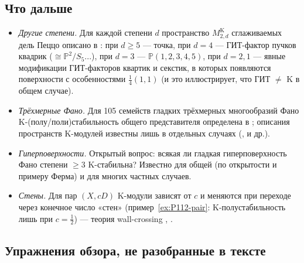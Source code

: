 \documentclass[11pt,a4paper]{article}
\theoremstyle{plain}
\theoremstyle{definition}
\theoremstyle{remark}
\newcommand{\PP}{\mathbb{P}}
\begin{document}
\subsection{Что дальше}

\begin{itemize}
\item \emph{Другие степени.} Для каждой степени $d$ пространство $M^{\mathrm K}_{2,d}$ сглаживаемых
дель Пеццо описано в \cite{OSS}: при $d\ge5$ --- точка, при $d=4$ --- ГИТ-фактор пучков квадрик
($\cong\PP^2/S_5$...), при $d=3$ --- $\PP(1,2,3,4,5)$, при $d=2,1$ --- явные модификации
ГИТ-факторов квартик и секстик, в которых появляются поверхности с особенностями $\frac14(1,1)$
(и это иллюстрирует, что ГИТ $\ne$ K в общем случае).
\item \emph{Трёхмерные Фано.} Для 105 семейств гладких трёхмерных многообразий Фано
K-(полу/поли)стабильность общего представителя определена в \cite{ACCFKMSV}; описания
пространств K-модулей известны лишь в отдельных случаях (\cite{ADL23}, \cite{DJKHQ} и др.).
\item \emph{Гиперповерхности.} Открытый вопрос: всякая ли гладкая гиперповерхность Фано степени
$\ge3$ K-стабильна? Известно для общей (по открытости и примеру Ферма) и для многих частных
случаев.
\item \emph{Стены.} Для пар $(X,cD)$ K-модули зависят от $c$ и меняются при переходе через
конечное число «стен» (пример~\ref{ex:P112-pair}: K-полустабильность лишь при $c=\frac12$) ---
теория wall-crossing \cite{ADL}, \cite{ADL23}.
\end{itemize}

\subsection{Упражнения обзора, не разобранные в тексте}
\end{document}
